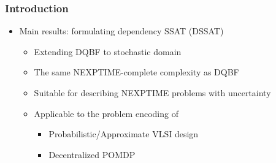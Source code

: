 \begin{frame}
      \frametitle{Introduction}
      \begin{itemize}
            \item Main results: formulating dependency SSAT (DSSAT)
                  \pause
                  \begin{itemize}
                        \item Extending DQBF to stochastic domain
                              \pause
                        \item The same NEXPTIME-complete complexity as DQBF
                              \pause
                        \item Suitable for describing NEXPTIME problems with uncertainty
                              \pause
                        \item Applicable to the problem encoding of
                              \pause
                              \begin{itemize}
                                    \item Probabilistic/Approximate VLSI design
                                          \pause
                                    \item Decentralized POMDP
                              \end{itemize}
                  \end{itemize}
      \end{itemize}
\end{frame}